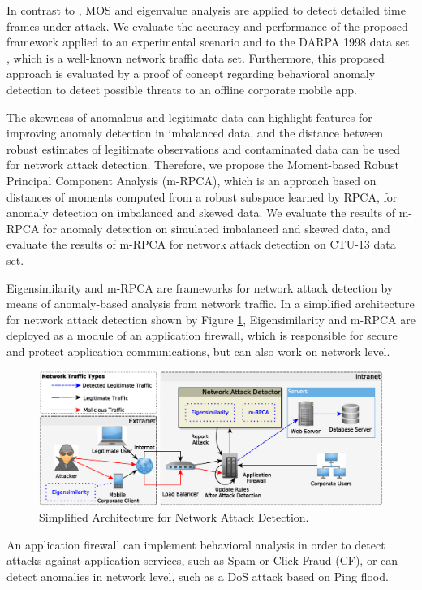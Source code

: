 In contrast to \cite{david2011blind,da2012improved,tenorio2013greatest}, MOS and eigenvalue analysis are applied to detect detailed time frames under attack. We evaluate the accuracy and performance of the proposed framework applied to an experimental scenario and to the DARPA 1998 data set \citep{osanaiye2016distributed}, which is a well-known network traffic data set. Furthermore, this proposed approach is evaluated by a proof of concept regarding behavioral anomaly detection to detect possible threats to an offline corporate mobile app. 

The skewness of anomalous and legitimate data can highlight features for improving anomaly detection in imbalanced data, and the distance between robust estimates of legitimate observations and contaminated data can be used for network attack detection. Therefore, we propose the Moment-based Robust Principal Component Analysis (m-RPCA), which is an approach based on distances of moments computed from a robust subspace learned by RPCA, for anomaly detection on imbalanced and skewed data. We evaluate the results of m-RPCA for anomaly detection on simulated imbalanced and skewed data, and evaluate the results of m-RPCA for network attack detection on CTU-13 data set.

Eigensimilarity and m-RPCA are frameworks for network attack detection by means of anomaly-based analysis from network traffic. In a simplified architecture for network attack detection shown by Figure \ref{fig:1.01}, Eigensimilarity and m-RPCA are deployed as a module of an application firewall, which is responsible for secure and protect application communications, but can also work on network level. 

\begin{figure}[h!]
	\centering
     \includegraphics[width=15cm]{figures/ch1/architecture.eps} 
     \caption{Simplified Architecture for Network Attack Detection.}
     \label{fig:1.01}
\end{figure}

An application firewall can implement behavioral analysis in order to detect attacks against application services, such as Spam or Click Fraud (CF), or can detect anomalies in network level, such as a DoS attack based on Ping flood.

